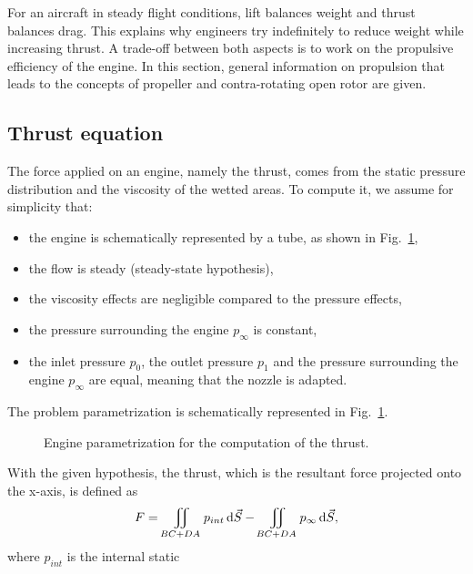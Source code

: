 
For an aircraft in steady flight conditions, 
lift balances weight and 
thrust balances drag. This explains why engineers try
indefinitely to reduce weight while increasing
thrust. A trade-off between both aspects is to work
on the propulsive efficiency of the engine. In this
section, general information on propulsion
that leads to the concepts of propeller and
contra-rotating open rotor are given.

\subsection{Thrust equation}
\label{sub:cror_thrust}

The force applied on an engine, namely the thrust,
comes from the static pressure
distribution and the viscosity of the wetted areas.
To compute it, we assume for simplicity that:
 \begin{itemize} \itemsep0pt \parskip0pt
  \item the engine is schematically represented by a tube,
  as shown in Fig.~\ref{fig:engine_parametrization},
  \item the flow is steady (steady-state hypothesis),
  \item the viscosity effects are negligible compared
  to the pressure effects,
  \item the pressure surrounding the engine $p_\infty$
  is constant,
  \item the inlet pressure $p_0$, the outlet pressure
  $p_1$ and the pressure surrounding the engine $p_\infty$ are equal,
  meaning that the nozzle is adapted.
\end{itemize}
The problem parametrization is schematically represented
in Fig.~\ref{fig:engine_parametrization}.
\begin{figure}[htp]
  \centering
  \quad{}
  \caption{Engine parametrization for the computation of the thrust.}
  \label{fig:engine_parametrization}
\end{figure}
With the given hypothesis, the thrust, which is
the resultant force
projected onto the x-axis, is defined as
\begin{equation}
	F = \iint_{BC + DA} p_{int} \diff \vec{S} - 
	    \iint_{BC + DA} p_{\infty} \diff \vec{S},
	\label{eq:thrust_1}
\end{equation}
where $p_{int}$ is the internal static
